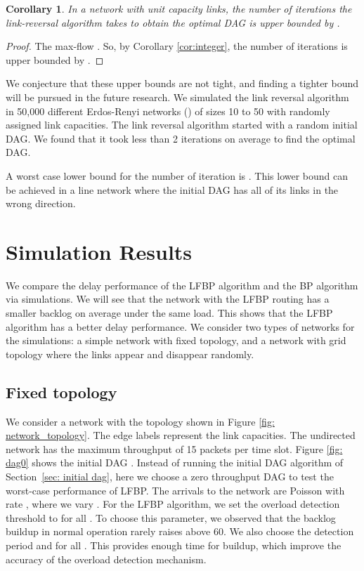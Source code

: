 \documentclass{sig-alternate-2013}
\newtheorem{corollary}{Corollary}
\begin{document}
\begin{corollary}
In a network with unit capacity links, the number of iterations the link-reversal algorithm takes to obtain the optimal DAG is upper bounded by .
\end{corollary}
\begin{proof}
The max-flow . So, by Corollary \ref{cor:integer}, the number of iterations is upper bounded by .
\end{proof}

We conjecture that these upper bounds are not tight, and finding a tighter bound will be pursued in the future research. We simulated the link reversal algorithm in 50,000 different Erdos-Renyi networks () of sizes 10 to 50 with randomly assigned link capacities. The link reversal algorithm started with a random initial DAG. We found that it took less than 2 iterations on average to find the optimal DAG.

A worst case lower bound for the number of iteration is . This lower bound can be achieved in a line network where the initial DAG has all of its links in the wrong direction.







\section{Simulation Results} \label{simulations}
We compare the delay performance of the LFBP algorithm and the BP algorithm via simulations. 
We will see that the network with the LFBP routing has a smaller backlog on average under the same load. This shows that the LFBP algorithm has a better delay performance. 
We consider two types of networks for the simulations: a simple network with fixed topology, and a network with grid topology where the links appear and disappear randomly. 


\subsection{Fixed topology}
We consider a network with the topology shown in Figure \ref{fig: network_topology}. The edge labels  represent the link capacities. The undirected network has the maximum throughput of 15 packets per time slot. Figure \ref{fig: dag0} shows the initial DAG . Instead of running the initial DAG algorithm of Section~\ref{sec: initial dag}, here we choose a zero throughput DAG to test the worst-case performance of LFBP. The arrivals to the network are Poisson with rate  , where we vary . For the LFBP algorithm, we set the overload detection threshold to  for all . To choose this parameter, we observed that the backlog buildup in normal operation rarely raises above 60. We also choose the detection period  and  for all . This provides enough time for buildup, which improve the accuracy of the overload detection mechanism.
\end{document}
